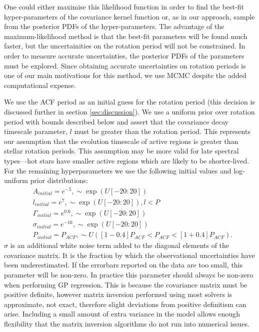 One could either maximise this likelihood function in order to find the
best-fit hyper-parameters of the covariance kernel function or, as in our
approach, sample from the posterior PDFs of the hyper-parameters.
The advantage of the maximum-likelihood method is that the best-fit parameters
will be found much faster, but the uncertainities on the rotation period
will not be constrained.
In order to measure accurate uncertainties, the posterior PDFs of the
parameters must be explored.
Since obtaining accurate uncertainties on rotation periods is one of our main
motivations for this method, we use MCMC despite the added computational
expense.

We use the ACF period as an initial guess for the rotation period (this
decision is discussed further in section \textsection \ref{sec:discussion}).
We use a uniform prior over rotation period with bounds described below and
assert that the covariance decay timescale parameter, $l$ must be greater than
the rotation period.
This represents our assumption that the evolution timescale of active regions
is greater than stellar rotation periods.
This assumption may be more valid for late spectral types---hot stars have
smaller active regions which are likely to be shorter-lived.
For the remaining hyperparameters we use the following initial values and
log-uniform prior distributions:
\begin{eqnarray}
 	&	A_{initial} = e^{-5}, \sim \exp(U[-20:20]) \\ \nonumber
 	&	l_{initial} = e^{7}, \sim \exp(U[-20:20]), l<P \\ \nonumber
 	&	\Gamma_{initial} = e^{0.6}, \sim \exp(U[-20:20]) \\ \nonumber
 	&	\sigma_{initial} = e^{-16}, \sim \exp(U[-20:20]) \\ \nonumber
 	&	P_{initial} = P_{ACF}, \sim U([1 - 0.4]P_{ACF}<P_{ACF}<[1 +
0.4]P_{ACF}).
 \end{eqnarray}
 \label{eq:initialisation}
$\sigma$ is an additional white noise term added to the diagonal elements of
the covariance matrix. It is the fraction by which the observational
uncertainties have been underestimated.
If the errorbars reported on the data are too small, this parameter will be
non-zero.
In practice this parameter should always be non-zero when performing GP
regression.
This is because the covariance matrix must be positive definite, however
matrix inversion performed using most solvers is approximate, not exact,
therefore slight deviations from positive definitism can arise.
Including a small amount of extra variance in the model allows enough
flexibility that the matrix inversion algorithms do not run into numerical
issues.

